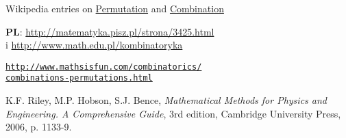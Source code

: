 \documentclass{article}
\newcommand{\pl}{\textbf{PL}: }
\begin{document}
\begin{thebibliography}{9}

    Wikipedia entries on \href{http://en.wikipedia.org/wiki/Permutation}{Permutation}
    and
    \href{http://en.wikipedia.org/wiki/Combination}{Combination}

    \pl
    \url{http://matematyka.pisz.pl/strona/3425.html} \\
    i \url{http://www.math.edu.pl/kombinatoryka}

        \href{http://www.mathsisfun.com/combinatorics/combinations-permutations.html}{\nolinkurl{http://www.mathsisfun.com/combinatorics/}}\\
	\href{http://www.mathsisfun.com/combinatorics/combinations-permutations.html}{\nolinkurl{combinations-permutations.html}}

     K.F. Riley, M.P. Hobson, S.J. Bence, \textit{Mathematical Methods for Physics and Engineering. A Comprehensive Guide}, 3rd edition, Cambridge University Press, 2006, p. 1133-9.

\end{thebibliography}
\end{document}
